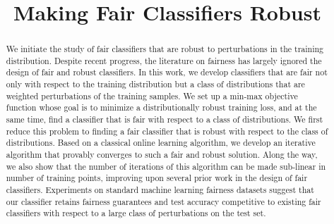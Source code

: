 \documentclass{article}
\title{Making Fair Classifiers Robust}
\begin{document}
\maketitle
\begin{abstract}
We initiate the study of fair classifiers that are robust to perturbations in the training distribution. Despite recent progress, the literature on fairness has largely ignored the design of fair and robust classifiers. In this work, we develop classifiers that are fair not only with respect to the training distribution but a class of distributions that are weighted perturbations of the training samples. We set up a min-max objective function whose goal is to minimize a distributionally robust training loss, and at the same time, find a classifier that is fair with respect to a class of distributions. We first reduce this problem to finding a fair classifier that is robust with respect to the class of distributions. Based on a classical online learning algorithm, we develop an iterative algorithm that provably converges to such a fair and robust solution. Along the way, we also show that the number of iterations of this algorithm can be made sub-linear in number of training points, improving upon several prior work in the design of fair classifiers. Experiments on standard machine learning fairness datasets suggest that our classifier retains fairness guarantees and test accuracy competitive to existing fair classifiers with respect to a large class of perturbations on the test set.  
\end{abstract}
\end{document}
